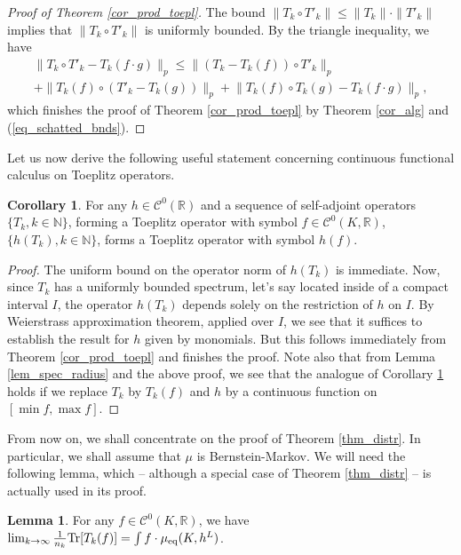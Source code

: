 \documentclass[12pt]{article}
\numberwithin{equation}{section}
\theoremstyle{theorem}
\theoremstyle{definition}
\newtheorem{lem}[thm]{Lemma}
\newtheorem{cor}[thm]{Corollary}
\theoremstyle{remark}
\newcommand{\real}{\mathbb{R}}
\newcommand{\nat}{\mathbb{N}}
\newcommand{\ccal}{\mathscr{C}}
\begin{document}
	\begin{proof}[Proof of Theorem \ref{cor_prod_toepl}]
		The bound $\| T_k \circ T'_k \| \leq \| T_k \| \cdot \| T'_k \|$ implies that $\| T_k \circ T'_k \|$ is uniformly bounded.
		By the triangle inequality, we have
		\begin{multline}
			\big\| T_k \circ T'_k - T_k(f \cdot g) \big\|_p
			\leq
			\big\| (T_k - T_k(f)) \circ T'_k  \big\|_p
			\\
			+
			\big\| T_k(f) \circ (T'_k - T_k(g)) \big\|_p
			+
			\big\| T_k(f) \circ T_k(g) - T_k(f \cdot g) \big\|_p,
		\end{multline}
		which finishes the proof of Theorem \ref{cor_prod_toepl} by Theorem \ref{cor_alg} and (\ref{eq_schatted_bnds}).
	\end{proof}	
	
	Let us now derive the following useful statement concerning continuous functional calculus on Toeplitz operators.
	\begin{cor}\label{cor_func_calc}
		For any $h \in \ccal^0(\real)$ and a sequence of self-adjoint operators $\{ T_k , k \in \nat \}$, forming a Toeplitz operator with symbol $f \in \ccal^0(K, \real)$, $\{ h(T_k), k \in \nat \}$, forms a Toeplitz operator with symbol $h(f)$.
	\end{cor}
	\begin{proof}
		The uniform bound on the operator norm of $h(T_k)$ is immediate.
		Now, since $T_k$ has a uniformly bounded spectrum, let's say located inside of a compact interval $I$, the operator $h(T_k)$ depends solely on the restriction of $h$ on $I$.
		By Weierstrass approximation theorem, applied over $I$, we see that it suffices to establish the result for $h$ given by monomials.
		But this follows immediately from Theorem \ref{cor_prod_toepl} and finishes the proof.
		Note also that from Lemma \ref{lem_spec_radius} and the above proof, we see that the analogue of Corollary \ref{cor_func_calc} holds if we replace $T_k$ by $T_k(f)$ and $h$ by a continuous function on $[\min f, \max f]$.
	\end{proof}
	\par 
	From now on, we shall concentrate on the proof of Theorem \ref{thm_distr}.
	In particular, we shall assume that $\mu$ is Bernstein-Markov.
	We will need the following lemma, which -- although a special case of Theorem \ref{thm_distr} -- is actually used in its proof.
	\begin{lem}\label{lem_trace_toepl}
		For any $f \in \ccal^0(K, \real)$, we have $\lim_{k \to \infty} \frac{1}{n_k} {\rm{Tr}}[T_k(f)] = \int f \cdot \mu_{\mathrm{eq}}(K, h^L)$.
	\end{lem}
\end{document}
